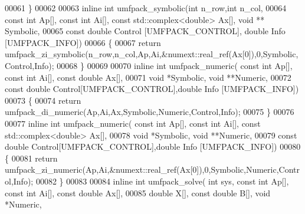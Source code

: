 \begin{DoxyCode}
00061 \}
00062 
00063 \textcolor{keyword}{inline} \textcolor{keywordtype}{int} umfpack\_symbolic(\textcolor{keywordtype}{int} n\_row,\textcolor{keywordtype}{int} n\_col,
00064                             \textcolor{keyword}{const} \textcolor{keywordtype}{int} Ap[], \textcolor{keyword}{const} \textcolor{keywordtype}{int} Ai[], \textcolor{keyword}{const} std::complex<double> Ax[], \textcolor{keywordtype}{void} **
      Symbolic,
00065                             \textcolor{keyword}{const} \textcolor{keywordtype}{double} Control [UMFPACK\_CONTROL], \textcolor{keywordtype}{double} Info [UMFPACK\_INFO])
00066 \{
00067   \textcolor{keywordflow}{return} umfpack\_zi\_symbolic(n\_row,n\_col,Ap,Ai,&numext::real\_ref(Ax[0]),0,Symbolic,Control,Info);
00068 \}
00069 
00070 \textcolor{keyword}{inline} \textcolor{keywordtype}{int} umfpack\_numeric( \textcolor{keyword}{const} \textcolor{keywordtype}{int} Ap[], \textcolor{keyword}{const} \textcolor{keywordtype}{int} Ai[], \textcolor{keyword}{const} \textcolor{keywordtype}{double} Ax[],
00071                             \textcolor{keywordtype}{void} *Symbolic, \textcolor{keywordtype}{void} **Numeric,
00072                             \textcolor{keyword}{const} \textcolor{keywordtype}{double} Control[UMFPACK\_CONTROL],\textcolor{keywordtype}{double} Info [UMFPACK\_INFO])
00073 \{
00074   \textcolor{keywordflow}{return} umfpack\_di\_numeric(Ap,Ai,Ax,Symbolic,Numeric,Control,Info);
00075 \}
00076 
00077 \textcolor{keyword}{inline} \textcolor{keywordtype}{int} umfpack\_numeric( \textcolor{keyword}{const} \textcolor{keywordtype}{int} Ap[], \textcolor{keyword}{const} \textcolor{keywordtype}{int} Ai[], \textcolor{keyword}{const} std::complex<double> Ax[],
00078                             \textcolor{keywordtype}{void} *Symbolic, \textcolor{keywordtype}{void} **Numeric,
00079                             \textcolor{keyword}{const} \textcolor{keywordtype}{double} Control[UMFPACK\_CONTROL],\textcolor{keywordtype}{double} Info [UMFPACK\_INFO])
00080 \{
00081   \textcolor{keywordflow}{return} umfpack\_zi\_numeric(Ap,Ai,&numext::real\_ref(Ax[0]),0,Symbolic,Numeric,Control,Info);
00082 \}
00083 
00084 \textcolor{keyword}{inline} \textcolor{keywordtype}{int} umfpack\_solve( \textcolor{keywordtype}{int} sys, \textcolor{keyword}{const} \textcolor{keywordtype}{int} Ap[], \textcolor{keyword}{const} \textcolor{keywordtype}{int} Ai[], \textcolor{keyword}{const} \textcolor{keywordtype}{double} Ax[],
00085                           \textcolor{keywordtype}{double} X[], \textcolor{keyword}{const} \textcolor{keywordtype}{double} B[], \textcolor{keywordtype}{void} *Numeric,

\end{DoxyCode}
